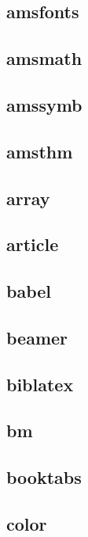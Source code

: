 \documentclass[12pt]{article}
\begin{document}
		\subsection{amsfonts}
		
		\subsection{amsmath}
		
		\subsection{amssymb}
		
		\subsection{amsthm}
		
		\subsection{array}
		
		\subsection{article}
		
		\subsection{babel}
		
		\subsection{beamer}
		
		\subsection{biblatex}
		
		\subsection{bm}
		
		\subsection{booktabs}
		
		\subsection{color}
			
\end{document}
